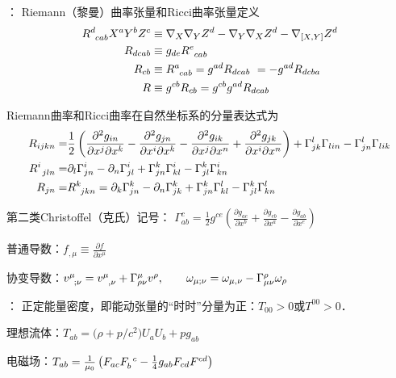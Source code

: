 ：
Riemann（黎曼）曲率张量和Ricci曲率张量定义
\begin{align*}
    R_{\hphantom{d} cab}^d{X^a}{Y^b}{Z^c} &\equiv {\nabla _X}{\nabla _Y}{Z^d} -
       {\nabla _Y}{\nabla _X}{Z^d} - {\nabla _{[X,Y]}}{Z^d} \\
    R_{dcab} &\equiv g_{de}R_{\hphantom{d} cab}^e   \\
    R_{cb} &\equiv R_{\hphantom{d} cab}^a = g^{ad}R_{dcab}  \ = - g^{ad}R_{dcba} \\
    R &\equiv  g^{cb}R_{cb} = g^{cb} g^{ad}R_{dcab}
\end{align*}

Riemann曲率和Ricci曲率在自然坐标系的分量表达式为
\begin{align*}
    R_{ijkn} =& \frac{1}{2}\left(
        \frac{\partial^2 g_{in}} {\partial x^j\partial x^k}
        - \frac{\partial^2 g_{jn}} {\partial x^i\partial x^k}
        - \frac{\partial^2 g_{ik}} {\partial x^j\partial x^n}
        + \frac{\partial^2 g_{jk}} {\partial x^i\partial x^n} \right) 
        + \Gamma_{jk}^l\Gamma _{lin} - \Gamma _{jn}^l\Gamma _{lik}  \\  
    R_{\hphantom{d} jln}^i =& {\partial_l} \Gamma_{jn}^{i} -\partial_n \Gamma_{jl}^{i}+
      \Gamma_{jn}^{k} \Gamma_{kl}^{i} - \Gamma_{jl}^{k}\Gamma_{kn}^{i}   \\
    R_{jn} =& R_{\hphantom{d} jkn}^k = {\partial_k} \Gamma_{jn}^{k} -\partial_n \Gamma_{jk}^{k}
    + \Gamma_{jn}^{k} \Gamma_{kl}^{l}- \Gamma_{jl}^{k}\Gamma_{kn}^{l}
\end{align*}

第二类Christoffel（克氏）记号：
$\Gamma_{ab}^c = \frac{1}{2}{g^{ce}}\left( {\frac{{\partial {g_{ae}}}}{{\partial {x^b}}}
    + \frac{{\partial {g_{eb}}}}{{\partial {x^a}}}  - \frac{{\partial {g_{ab}}}}
    {{\partial {x^e}}}} \right) $

普通导数：$f_{,\mu}\equiv\frac{\partial f}{\partial x^\mu}$

协变导数：$v^\mu_{\hphantom{\nu} ;\nu}= v^\mu _{\hphantom{\mu} ,\nu}+ \Gamma^\mu_{\rho\nu}v^\rho,\qquad
\omega_{\mu ;\nu}=\omega_{\mu ,\nu}- \Gamma^\rho_{\mu\nu}\omega_\rho$


：
正定能量密度，即能动张量的“时时”分量为正：$T_{00}>0$或$T^{00}>0$．

理想流体：$T_{ab}=\bigl(\rho + p/c^2 \bigr) U_a U_b +p g_{ab}$

电磁场：$T_{ab}=\frac{1}{\mu_0} \left( F_{ac} F_{b}^{\hphantom{b} c} - \frac{1}{4} g_{ab} F_{cd} F^{cd} \right)$

